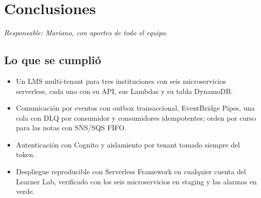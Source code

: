 \section{Conclusiones}
\label{sec:conclusiones}
\textit{Responsable: Mariano, con aportes de todo el equipo.}

\subsection{Lo que se cumplió}
\begin{itemize}
  \item Un LMS multi-tenant para tres instituciones con seis microservicios serverless, cada uno con su
        API, sus Lambdas y su tabla DynamoDB.
  \item Comunicación por eventos con outbox transaccional, EventBridge Pipes, una cola con DLQ por
        consumidor y consumidores idempotentes; orden por curso para las notas con SNS/SQS FIFO.
  \item Autenticación con Cognito y aislamiento por tenant tomado siempre del token.
  \item Despliegue reproducible con Serverless Framework en cualquier cuenta del Learner Lab, verificado
        con los seis microservicios en staging y las alarmas en verde.
\end{itemize}

